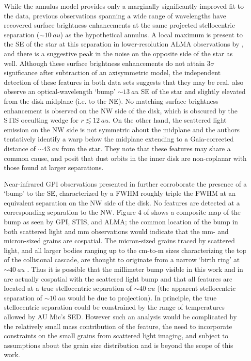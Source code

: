 \documentclass[modern]{aastex62}
\begin{document}
While the annulus model provides only a marginally significantly improved fit to the data, previous observations spanning a wide range of wavelengths have recovered surface brightness enhancements at the same projected stellocentric separation ($\sim \SI{10}{au}$) as the hypothetical annulus.
A local maximum is present to the SE of the star at this separation in lower-resolution ALMA observations by \cite{macgregor13}, and there is a suggestive peak in the noise on the opposite side of the star as well.
Although these surface brightness enhancements do not attain $3 \sigma$ significance after subtraction of an axisymmetric model, the independent detection of these features in both data sets suggests that they may be real.  
\cite{schneider14} also observe an optical-wavelength `bump' $\sim \SI{13}{au}$ SE of the star and slightly elevated from the disk midplane (i.e. to the NE).
No matching surface brightness enhancement is observed on the NW side of the disk, which is obscured by the STIS occulting wedge for $r \lesssim \SI{12}{au}$.
On the other hand, the scattered light emission on the NW side is not symmetric about the midplane and the authors tentatively identify a warp below the midplane extending to a Gaia-corrected distance of $\sim \SI{43}{au}$ from the star.
They note that these features may share a common cause, and posit that dust orbits in the inner disk are non-coplanar with those found at larger separations.

Near-infrared GPI observations presented in \cite{wang15} further corroborate the presence of a `bump' to the SE, characterized by a FWHM roughly triple the FWHM at an equivalent separation on the NW side of the disk. 
No features are detected at a corresponding separation to the NW.
Figure 4 of \cite{wang15} shows a composite map of the bump as seen by GPI, STIS, and ALMA; the common location of the bump in both scattered light and mm observations would indicate that the mm- and micron-sized grains are cospatial.
The micron-sized grains traced by scattered light, and all larger bodies ranging up to the cm-to-m sizes characterizing the top of the collisional cascade, are thought to originate from a narrow `birth ring' at $\sim \SI{40}{au}$ \citep{strubbe&chiang06}. 
Thus it is possible that the millimeter bump visible in this work and in \cite{macgregor13} are actually cospatial with the scattered light bump and that all features are located at a true stellocentric separation of $\sim \SI{40}{au}$ (the apparent stellocentric separation of $\sim \SI{10}{au}$ would be due to projection).
In principle, the true stellocentric separation could be constrained by the range of temperatures allowed by AU Mic's SED. 
However such an analysis would be complicated by the relatively small mass contribution of the feature, the need to incorporate constraints on the small grains from scattered light imaging, and subject to assumptions about the grain size distribution and is beyond the scope of this work.
\end{document}

